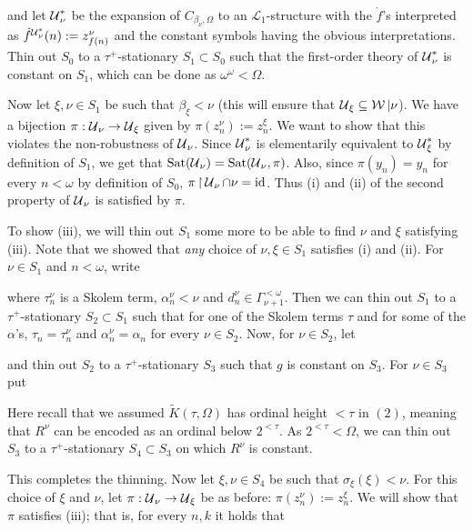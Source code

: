 {and let $\operatorname{\mathcal{U}}_\nu^*$ be the expansion of $C_{\beta_\nu,\Omega}$ to an $\mathcal L_1$-structure with the $\dot f$'s interpreted as $\dot f^{\operatorname{\mathcal{U}}_\nu^*}(n):=z_{f(n)}^\nu$ and the constant symbols having the obvious interpretations. Thin out $S_0$ to a $\tau^+$-stationary $S_1\subset S_0$ such that the first-order theory of $\operatorname{\mathcal{U}}_\nu^*$ is constant on $S_1$, which can be done as $\omega^\omega<\Omega$.

\qquad Now let $\xi,\nu\in S_1$ be such that $\beta_\xi<\nu$ (this will ensure that $\operatorname{\mathcal{U}}_\xi\subseteq\operatorname{\mathcal{W}}|\nu$). We have a bijection $\pi:\operatorname{\mathcal{U}}_\nu\to\operatorname{\mathcal{U}}_\xi$ given by $\pi(z_n^\nu):=z_n^\xi$. We want to show that this violates the non-robustness of $\operatorname{\mathcal{U}}_\nu$. Since $\operatorname{\mathcal{U}}_\nu^*$ is elementarily equivalent to $\operatorname{\mathcal{U}}_\xi^*$ by definition of $S_1$, we get that $\operatorname{Sat}(\operatorname{\mathcal{U}}_\nu)=\operatorname{Sat}(\operatorname{\mathcal{U}}_\nu,\pi)$. Also, since $\pi(y_n)=y_n$ for every $n<\omega$ by definition of $S_0$, $\pi\operatorname{\upharpoonright}\operatorname{\mathcal{U}}_\nu\cap\nu=\operatorname{id}$. Thus (i) and (ii) of the second property of $\operatorname{\mathcal{U}}_\nu$ is satisfied by $\pi$.

\qquad To show (iii), we will thin out $S_1$ some more to be able to find $\nu$ and $\xi$ satisfying (iii). Note that we showed that \textit{any} choice of $\nu,\xi\in S_1$ satisfies (i) and (ii). For $\nu\in S_1$ and $n<\omega$, write

where $\tau_n^\nu$ is a Skolem term, $\alpha_n^\nu<\nu$ and $d_n^\nu\in\Gamma^{<\omega}_{\nu+1}$. Then we can thin out $S_1$ to a $\tau^+$-stationary $S_2\subset S_1$ such that for one of the Skolem terms $\tau$ and for some of the $\alpha$'s, $\tau_n=\tau_n^\nu$ and $\alpha_n^\nu=\alpha_n$ for every $\nu\in S_2$. Now, for $\nu\in S_2$, let

and thin out $S_2$ to a $\tau^+$-stationary $S_3$ such that $g$ is constant on $S_3$. For $\nu\in S_3$ put

Here recall that we assumed $\tilde K(\tau,\Omega)$ has ordinal height $<\tau$ in $(2)$, meaning that $R^\nu$ can be encoded as an ordinal below $2^{<\tau}$. As $2^{<\tau}<\Omega$, we can thin out $S_3$ to a $\tau^+$-stationary $S_4\subset S_3$ on which $R^\nu$ is constant.

\qquad This completes the thinning. Now let $\xi,\nu\in S_4$ be such that $\sigma_\xi(\xi)<\nu$. For this choice of $\xi$ and $\nu$, let $\pi:\operatorname{\mathcal{U}}_\nu\to\operatorname{\mathcal{U}}_\xi$ be as before: $\pi(z_n^\nu):=z_n^\xi$. We will show that $\pi$ satisfies (iii); that is, for every $n,k$ it holds that

}
